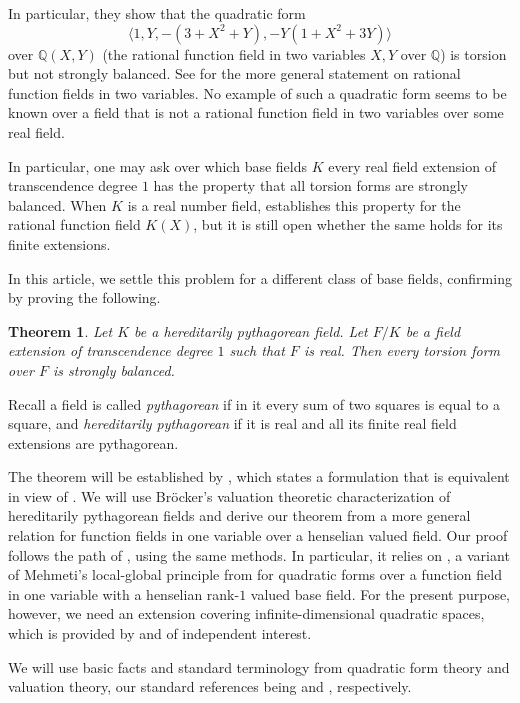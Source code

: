 \documentclass[twoside,11pt]{amsart}
\numberwithin{equation}{section}
\newtheorem*{thm*}{Theorem}
\theoremstyle{definition}
\newcommand{\la}{\langle}
\newcommand{\ra}{\rangle}
\newcommand{\qq}{\mathbb{Q}}
\begin{document}
In particular, they show that the quadratic form $$\la 1,Y,-(3+X^2+Y),-Y(1+X^2+3Y)\ra$$ over $\qq(X,Y)$ (the rational function field in two variables $X,Y$ over $\qq$) is torsion but not strongly balanced. 
See  for the more general statement on rational function fields in two variables. 
No example of such a quadratic form seems to be known over a field that is not a rational function field in two variables over some real field.

In particular, one may ask over which base fields $K$ every real field extension of transcendence degree $1$ has the property that all torsion forms are strongly balanced. 
When $K$ is a real number field, \cite[Satz 5]{AP77} establishes this property for the rational function field $K(X)$, but it is still open whether the same holds for its finite extensions.

    In this article, we settle this problem for a different class of base fields, confirming \cite[Conjecture 4.4]{Bec06} by proving the following.

\begin{thm*}
    Let $K$ be a hereditarily pythagorean field. Let $F/K$ be a field extension of transcendence degree $1$ such that $F$ is real. 
    Then every torsion form over $F$ is strongly balanced.
\end{thm*}

Recall a field is called \emph{pythagorean} if in it every sum of two squares is equal to a square,
and \emph{hereditarily
pythagorean} if it is real and all its finite real field extensions are pythagorean.

The theorem will be established by , which states a formulation that is equivalent in view of .
We will use Br\"ocker's valuation theoretic characterization of hereditarily pythagorean fields \cite[Prop.~3.5]{Bro76} and derive our theorem from a more general relation for function fields in one variable over a henselian valued field.
Our proof follows the path of  \cite{BDGMZ23}, using the same methods. In particular, it relies on  \cite[Theorem 4.4]{BDGMZ23}, a variant of Mehmeti's local-global principle from \cite{Meh19} for quadratic forms over a function field in one variable with a henselian rank-$1$ valued base field.
For the present purpose, however, we need an extension covering infinite-dimensional quadratic spaces, which is provided by  and of independent interest.

We will use basic facts and standard terminology from quadratic form theory and valuation theory, our standard references being \cite{Lam05} and \cite{EP05}, respectively.
\end{document}
